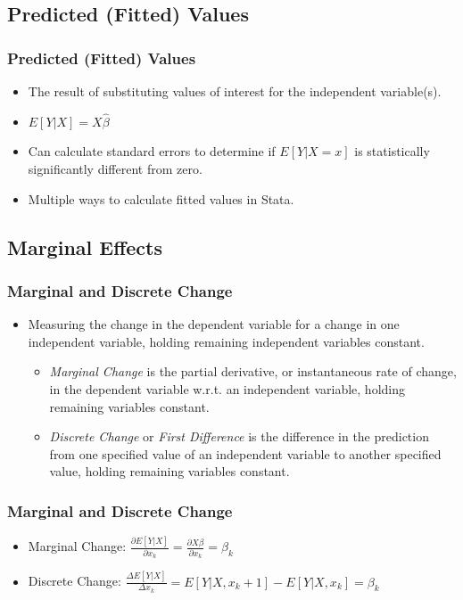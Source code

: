 \documentclass{beamer}
\begin{document}
\subsection{Predicted (Fitted) Values}

\begin{frame}
	\frametitle{Predicted (Fitted) Values}
		\begin{itemize}
			\item The result of substituting values of interest for the independent variable(s).
			\item $E[Y|X]=X\hat{\beta}$
			\item Can calculate standard errors to determine if $E[Y|X=x]$ is statistically significantly different from zero.
			\item Multiple ways to calculate fitted values in Stata.
		\end{itemize}
\end{frame}

\subsection{Marginal Effects}

\begin{frame}
	\frametitle{Marginal and Discrete Change}
		\begin{itemize}
			\item Measuring the change in the dependent variable for a change in one independent variable, holding remaining independent variables constant.
				\begin{itemize}
					\item \textit{Marginal Change} is the partial derivative, or instantaneous rate of change, in the dependent variable w.r.t. an independent variable, holding remaining variables constant.
					\item \textit{Discrete Change} or \textit{First Difference} is the difference in the prediction from one specified value of an independent variable to another specified value, holding remaining variables constant.
				\end{itemize}
		\end{itemize}
\end{frame}

\begin{frame}
	\frametitle{Marginal and Discrete Change}
		\begin{itemize}
			\item Marginal Change: $\frac{\partial E[Y|X]}{\partial x_{k}}=\frac{\partial X\beta}{\partial x_{k}}=\beta_{k}$
			\item Discrete Change: $\frac{\Delta E[Y|X]}{\Delta x_{k}}=E[Y|X, x_{k}+1]-E[Y|X, x_{k}]=\beta_{k}$
		\end{itemize}
\end{frame}
\end{document}
